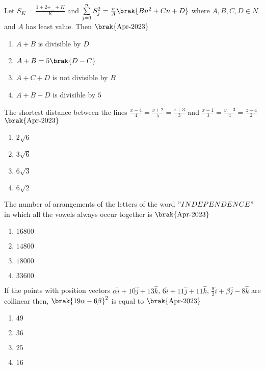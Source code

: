 \item{
Let $S_K=\frac{1+2+_{...}+K}{K}$ and $\sum\limits_{j=1}^n S_j^2=\frac{n}{A}\brak{Bn^2+Cn+D}$ where $A,B,C,D\in N$ and $A$ has least value. Then
\hfill{$\brak{\text{Apr-2023}}$}
\begin{multicols}{2}
\begin{enumerate}
\item $A+B$ is divisible by $D$
\item $A+B=5\brak{D-C}$
\item $A+C+D$ is not divisible by $B$
\item $A+B+D$ is divisible by $5$
\end{enumerate}
\end{multicols}
}
\item{
The shortest distance between the lines $\frac{x-4}{4}=\frac{y+2}{5}=\frac{z+3}{3}$ and $\frac{x-1}{3}=\frac{y-3}{4}=\frac{z-4}{2}$
\hfill{$\brak{\text{Apr-2023}}$}
\begin{multicols}{4}
\begin{enumerate}
\item $2\sqrt{6}$
\item $3\sqrt{6}$
\item $6\sqrt{3}$
\item $6\sqrt{2}$
\end{enumerate}
\end{multicols}
}
\item{
The number of arrangements of the letters of the word $"INDEPENDENCE"$ in which all the vowels always occur together is
\hfill{$\brak{\text{Apr-2023}}$}
\begin{multicols}{4}
\begin{enumerate}
\item $16800$
\item $14800$
\item $18000$
\item $33600$
\end{enumerate}
\end{multicols}
}
\item{
If the points with position vectors $\alpha\hat{i}+10\hat{j}+13\hat{k}$, $6\hat{i}+11\hat{j}+11\hat{k}$, $\frac{9}{2}\hat{i}+\beta\hat{j}-8\hat{k}$ are collinear then, $\brak{19\alpha-6\beta}^2$ is equal to
\hfill{$\brak{\text{Apr-2023}}$}
\begin{multicols}{4}
\begin{enumerate}
\item $49$
\item $36$
\item $25$
\item $16$
\end{enumerate}
\end{multicols}
}
